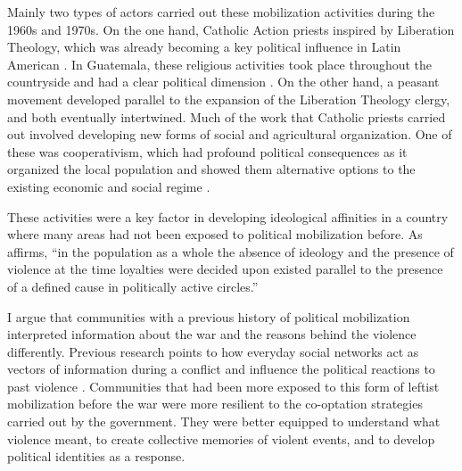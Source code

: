 \documentclass[12pt, notitlepage]{article}
\begin{document}
Mainly two types of actors carried out these mobilization activities during the 1960s and 1970s.
On the one hand, Catholic Action priests inspired by Liberation Theology, which was already becoming a key political influence in Latin American \citep[e.g.][]{Wood:2003aa}.
In Guatemala, these religious activities took place throughout the countryside and had a clear political dimension \citep{Carmack:1988aa, Manz:1988aa, Manz:2004aa, LeBot:1992aa, Bateson:2013aa}.
On the other hand, a peasant movement developed parallel to the expansion of the Liberation Theology clergy, and both eventually intertwined.
Much of the work that Catholic priests carried out involved developing new forms of social and agricultural organization.
One of these was cooperativism, which had profound political consequences as it organized the local population and showed them alternative options to the existing economic and social regime \citep{Arias:1992aa, Nelson:2009aa, Bateson:2013aa}.

These activities were a key factor in developing ideological affinities in a country where many areas had not been exposed to political mobilization before.
As \citet[84]{Lofving:2005aa} affirms, ``in the population as a whole the absence of ideology and the presence of violence at the time loyalties were decided upon existed parallel to the presence of a defined cause in politically active circles.''

I argue that communities with a previous history of political mobilization interpreted information about the war and the reasons behind the violence differently.
Previous research points to how everyday social networks act as vectors of information during a conflict \citep{Shesterinina:2016aa} and influence the political reactions to past violence \citep{Rydgren:2007aa, Dorff:2017aa}.
Communities that had been more exposed to this form of leftist mobilization before the war were more resilient to the co-optation strategies carried out by the government.
They were better equipped to understand what violence meant, to create collective memories of violent events, and to develop political identities as a response.
\end{document}
